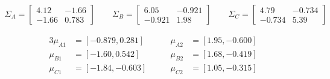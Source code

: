 \begin{align*}
  \Sigma_A  = \begin{bmatrix} 4.12 & -1.66\\ -1.66 &  0.783 \end{bmatrix} \qquad
  \Sigma_B  = \begin{bmatrix} 6.05 & -0.921\\ -0.921 & 1.98 \end{bmatrix} \qquad
  \Sigma_C  = \begin{bmatrix} 4.79  & -0.734\\ -0.734 &  5.39 \end{bmatrix}
\end{align*}

\begin{alignat*}{3}
    \mu_{A1} &=  [ -0.879, 0.281 ]
    \qquad &\mu_{A2} &=  [ 1.95, -0.600 ]\\
    \mu_{B1} &= [ -1.60, 0.542 ]
    \qquad &\mu_{B2} &= [ 1.68, -0.419 ]\\
    \mu_{C1} &=  [ -1.84, -0.603 ]
    \qquad &\mu_{C2} &= [ 1.05, -0.315 ]\\
\end{alignat*}
\clearpage

%
